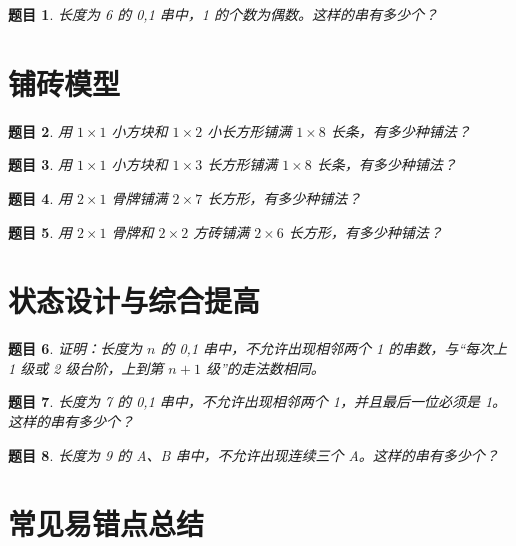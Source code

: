 \documentclass[11pt,a4paper,fontset=fandol]{ctexart}
\theoremstyle{formalexample}
\newtheorem{exercise}{题目}[section]
\begin{document}
\begin{exercise}
长度为 6 的 0,1 串中，1 的个数为偶数。这样的串有多少个？
\end{exercise}

\section{铺砖模型}

\begin{exercise}
用 $1\times 1$ 小方块和 $1\times 2$ 小长方形铺满 $1\times 8$ 长条，有多少种铺法？
\end{exercise}

\begin{exercise}
用 $1\times 1$ 小方块和 $1\times 3$ 长方形铺满 $1\times 8$ 长条，有多少种铺法？
\end{exercise}

\begin{exercise}
用 $2\times 1$ 骨牌铺满 $2\times 7$ 长方形，有多少种铺法？
\end{exercise}

\begin{exercise}
用 $2\times 1$ 骨牌和 $2\times 2$ 方砖铺满 $2\times 6$ 长方形，有多少种铺法？
\end{exercise}

\section{状态设计与综合提高}

\begin{exercise}
证明：长度为 $n$ 的 0,1 串中，不允许出现相邻两个 1 的串数，与“每次上 1 级或 2 级台阶，上到第 $n+1$ 级”的走法数相同。
\end{exercise}

\begin{exercise}
长度为 7 的 0,1 串中，不允许出现相邻两个 1，并且最后一位必须是 1。这样的串有多少个？
\end{exercise}

\begin{exercise}
长度为 9 的 A、B 串中，不允许出现连续三个 A。这样的串有多少个？
\end{exercise}

\newpage
\section{常见易错点总结}
\end{document}
